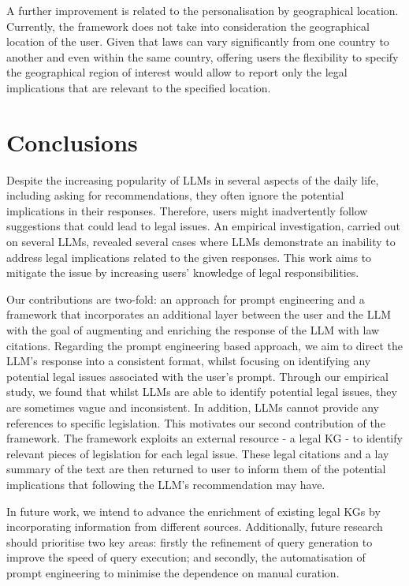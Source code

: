 \documentclass[sn-mathphys-num]{sn-jnl}%
\begin{document}
A further improvement is related to the personalisation by geographical location. 
Currently, the framework does not take into consideration the geographical location of the user. Given that laws can vary significantly from one country to another and even within the same country, 
offering users the flexibility to specify the geographical region of interest would allow to report only the legal implications that are relevant to the specified location. 

\section{Conclusions}\label{sec:conclusions}

Despite the increasing popularity of LLMs in several aspects of the daily life, including asking for recommendations, they often ignore the potential implications in their responses. Therefore, users might inadvertently follow suggestions that could lead to legal issues. 
An empirical investigation, carried out on several LLMs, revealed several cases where LLMs demonstrate an inability to address legal implications related to the given responses.
This work aims to mitigate the issue by increasing users' knowledge of legal responsibilities. 

Our contributions are two-fold: an approach for prompt engineering and a framework that incorporates an additional layer between the user and the LLM with the goal of augmenting and enriching the response of the LLM with law citations.
Regarding the prompt engineering based approach, we aim to direct the LLM's response into a consistent format, whilst focusing on identifying any potential legal issues associated with the user's prompt. Through our empirical study, we found that whilst LLMs are able to identify potential legal issues, they are sometimes vague and inconsistent. In addition, LLMs cannot provide any references to specific legislation. 
This motivates our second contribution of the framework. The framework exploits an external resource - a legal KG - to identify relevant pieces of legislation for each legal issue. These legal citations and a lay summary of the text are then returned to user to inform them of the potential implications that following the LLM's recommendation may have.

In future work, we intend to advance the enrichment of existing legal KGs by incorporating information from different sources. Additionally, future research should prioritise two key areas: firstly the refinement of query generation to improve the speed of query execution; and secondly, the automatisation of prompt engineering to minimise the dependence on manual curation.  
\end{document}
